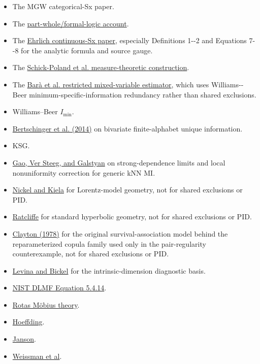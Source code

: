 \documentclass[
  11pt,
  a4paper,
]{article}
\providecommand{\tightlist}{%
  \setlength{\itemsep}{0pt}\setlength{\parskip}{0pt}}
\begin{document}
\begin{itemize}
\tightlist
\item
  The MGW categorical-Sx paper.
\item
  The
  \href{https://doi.org/10.1098/rspa.2021.0110}{part-whole/formal-logic
  account}.
\item
  The \href{https://arxiv.org/html/2311.06373v3}{Ehrlich continuous-Sx
  paper}, especially Definitions 1-\/-2 and Equations 7-\/-8 for the
  analytic formula and source gauge.
\item
  The \href{https://arxiv.org/abs/2106.12393v2}{Schick-Poland et al.
  measure-theoretic construction}.
\item
  The \href{https://doi.org/10.1103/58bg-5n9s}{Barà et al. restricted
  mixed-variable estimator}, which uses Williams-\/-Beer
  minimum-specific-information redundancy rather than shared exclusions.
\item
  Williams--Beer \(I_{\min}\).
\item
  \href{https://doi.org/10.3390/e16042161}{Bertschinger et al. (2014)}
  on bivariate finite-alphabet unique information.
\item
  KSG.
\item
  \href{https://proceedings.mlr.press/v38/gao15.html}{Gao, Ver Steeg,
  and Galstyan} on strong-dependence limits and local nonuniformity
  correction for generic kNN MI.
\item
  \href{https://proceedings.mlr.press/v80/nickel18a.html}{Nickel and
  Kiela} for Lorentz-model geometry, not for shared exclusions or PID.
\item
  \href{https://doi.org/10.1007/978-0-387-47322-2}{Ratcliffe} for
  standard hyperbolic geometry, not for shared exclusions or PID.
\item
  \href{https://doi.org/10.1093/biomet/65.1.141}{Clayton (1978)} for the
  original survival-association model behind the reparameterized copula
  family used only in the pair-regularity counterexample, not for shared
  exclusions or PID.
\item
  \href{https://papers.nips.cc/paper_files/paper/2004/hash/74934548253bcab8490ebd74afed7031-Abstract.html}{Levina
  and Bickel} for the intrinsic-dimension diagnostic basis.
\item
  \href{https://dlmf.nist.gov/5.4.E14}{NIST DLMF Equation 5.4.14}.
\item
  \href{https://doi.org/10.1007/BF00531932}{Rota\textquotesingle s
  Möbius theory}.
\item
  \href{https://doi.org/10.1080/01621459.1963.10500830}{Hoeffding}.
\item
  \href{https://doi.org/10.1002/rsa.20008}{Janson}.
\item
  \href{https://shiftleft.com/mirrors/www.hpl.hp.com/techreports/2003/HPL-2003-97R1.pdf}{Weissman
  et al}.
\end{itemize}
\end{document}
